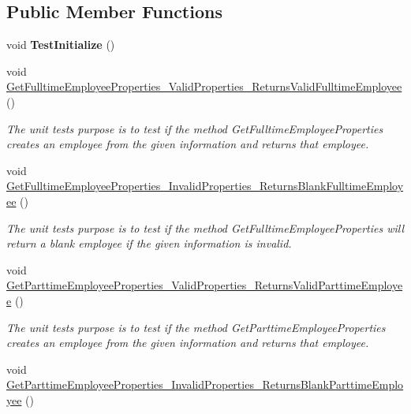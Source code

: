 \subsection*{Public Member Functions}
\begin{DoxyCompactItemize}
\item 
\hypertarget{class_the_company_1_1_tests_1_1_add_employee_tests_a3fdc4450cb4b3557355341ac357573ab}{}void {\bfseries Test\+Initialize} ()\label{class_the_company_1_1_tests_1_1_add_employee_tests_a3fdc4450cb4b3557355341ac357573ab}

\item 
void \hyperlink{class_the_company_1_1_tests_1_1_add_employee_tests_a6eb37c62a430e5823a61cb158ca02a8f}{Get\+Fulltime\+Employee\+Properties\+\_\+\+Valid\+Properties\+\_\+\+Returns\+Valid\+Fulltime\+Employee} ()
\begin{DoxyCompactList}\small\item\em The unit test\textquotesingle{}s purpose is to test if the method Get\+Fulltime\+Employee\+Properties creates an employee from the given information and returns that employee. \end{DoxyCompactList}\item 
void \hyperlink{class_the_company_1_1_tests_1_1_add_employee_tests_a4eb5e98f7407d60af8177d56907dd9bb}{Get\+Fulltime\+Employee\+Properties\+\_\+\+Invalid\+Properties\+\_\+\+Returns\+Blank\+Fulltime\+Employee} ()
\begin{DoxyCompactList}\small\item\em The unit test\textquotesingle{}s purpose is to test if the method Get\+Fulltime\+Employee\+Properties will return a blank employee if the given information is invalid. \end{DoxyCompactList}\item 
void \hyperlink{class_the_company_1_1_tests_1_1_add_employee_tests_a2de59a3ddfb3172e91cf48a3b7003a39}{Get\+Parttime\+Employee\+Properties\+\_\+\+Valid\+Properties\+\_\+\+Returns\+Valid\+Parttime\+Employee} ()
\begin{DoxyCompactList}\small\item\em The unit test\textquotesingle{}s purpose is to test if the method Get\+Parttime\+Employee\+Properties creates an employee from the given information and returns that employee. \end{DoxyCompactList}\item 
void \hyperlink{class_the_company_1_1_tests_1_1_add_employee_tests_aa9ac558d1283759c06c7beb936687ec5}{Get\+Parttime\+Employee\+Properties\+\_\+\+Invalid\+Properties\+\_\+\+Returns\+Blank\+Parttime\+Employee} ()

\end{DoxyCompactItemize}

